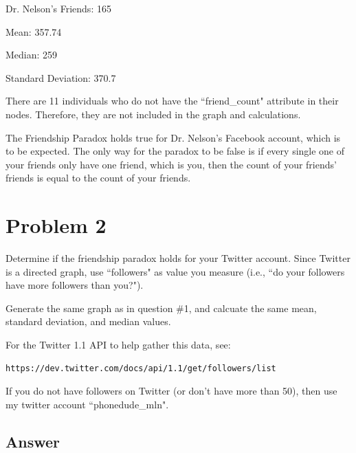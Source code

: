 \documentclass[12pt]{article}
\begin{document}
\noindent
Dr. Nelson's Friends: 165

\noindent
Mean: 357.74

\noindent
Median: 259

\noindent
Standard Deviation: 370.7

There are 11 individuals who do not have the ``friend\_count" attribute in their nodes. Therefore, they are not included in the graph and calculations.

The Friendship Paradox holds true for Dr. Nelson's Facebook account, which is to be expected. The only way for the paradox to be false is if every single one of your friends only have one friend, which is you, then the count of your friends' friends is equal to the count of your friends.

\section*{Problem 2}
Determine if the friendship paradox holds for your Twitter account.
Since Twitter is a directed graph, use ``followers" as value you measure
(i.e., ``do your followers have more followers than you?").

Generate the same graph as in question \#1, and calcuate the same 
mean, standard deviation, and median values.

\noindent
For the Twitter 1.1 API to help gather this data, see:

\noindent
\begin{verbatim}
https://dev.twitter.com/docs/api/1.1/get/followers/list
\end{verbatim}

If you do not have followers on Twitter (or don't have more than 50),
then use my twitter account ``phonedude\_mln".



\subsection*{Answer}
\end{document}
